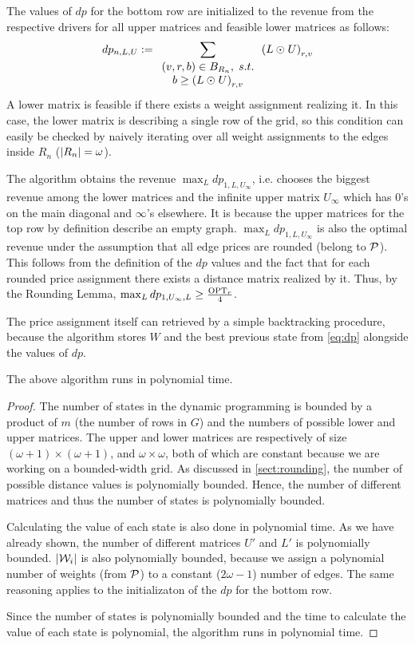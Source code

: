 The values of $dp$ for the bottom row are initialized to the revenue from the respective
drivers for all upper matrices and feasible lower matrices as follows:
\[ dp_{n, L, U} := \sum_{
    \begin{array}{c} (v, r, b) \in B_{R_n}, \; s.t. \\
    b \geq \left( L \odot_{} U \right)_{r, v} \end{array}}
    \left( L \odot_{} U \right)_{r, v} \]
A lower matrix is feasible if there exists a weight assignment realizing it.
In this case, the lower matrix is describing a single row of the grid,
so this condition can easily be checked by naively iterating over all weight assignments
to the edges inside $R_n$ ($\left| R_n \right| = \omega$).

The algorithm obtains the revenue $\max_{L} dp_{1, L, U_{\infty}}$, i.e.
chooses the biggest revenue among the lower matrices and the
infinite upper matrix $U_{\infty}$ which has $0$'s on the main diagonal and $\infty$'s elsewhere.
It is because the upper matrices for the top row by definition describe an empty graph.
$\max_{L} dp_{1, L, U_{\infty}}$ is also the optimal revenue under the assumption that all edge prices are rounded (belong to $\mathcal{P}$).
This follows from the definition of the $dp$ values and the fact that for each rounded price assignment there exists a distance matrix realized by it.
Thus, by the Rounding Lemma, $\max_{L} dp_{1, U_{\infty}, L} \geq \frac{\mathrm{OPT}_r}{4}$.

The price assignment itself can retrieved by a simple backtracking procedure, because
the algorithm stores $W$ and the best previous state from \cref{eq:dp}
alongside the values of $dp$.

\begin{lemma}
    The above algorithm runs in polynomial time.
\end{lemma}
\begin{proof}
    The number of states in the dynamic programming is bounded by a product of $m$ (the number of rows in $G$) and the numbers of possible lower and upper matrices.
    The upper and lower matrices are respectively of size $(\omega + 1) \times (\omega + 1)$, and $\omega \times \omega$,
    both of which are constant because we are working on a bounded-width grid.
    As discussed in \cref{sect:rounding}, the number of possible distance values is polynomially bounded.
    Hence, the number of different matrices and thus the number of states is polynomially bounded.

    Calculating the value of each state is also done in polynomial time.
    As we have already shown, the number of different matrices $U'$ and $L'$ is polynomially bounded.
    $\left| \mathcal{W}_i \right|$ is also polynomially bounded, because we assign a polynomial number of weights (from $\mathcal{P}$) to a constant ($2\omega - 1$) number of edges.
    The same reasoning applies to the initializaton of the $dp$ for the bottom row.

    Since the number of states is polynomially bounded and the time to calculate the value of each state is polynomial, the algorithm runs in polynomial time.
\end{proof}


